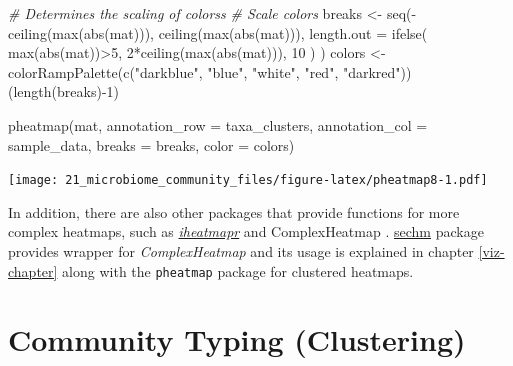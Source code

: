 \documentclass[
]{book}
\newenvironment{Shaded}{\begin{snugshade}}{\end{snugshade}}
\newcommand{\AttributeTok}[1]{\textcolor[rgb]{0.77,0.63,0.00}{#1}}
\newcommand{\CommentTok}[1]{\textcolor[rgb]{0.56,0.35,0.01}{\textit{#1}}}
\newcommand{\DecValTok}[1]{\textcolor[rgb]{0.00,0.00,0.81}{#1}}
\newcommand{\FunctionTok}[1]{\textcolor[rgb]{0.00,0.00,0.00}{#1}}
\newcommand{\NormalTok}[1]{#1}
\newcommand{\OtherTok}[1]{\textcolor[rgb]{0.56,0.35,0.01}{#1}}
\newcommand{\SpecialCharTok}[1]{\textcolor[rgb]{0.00,0.00,0.00}{#1}}
\newcommand{\StringTok}[1]{\textcolor[rgb]{0.31,0.60,0.02}{#1}}
\begin{document}
\begin{Shaded}
\begin{Highlighting}[]
\CommentTok{\# Determines the scaling of colorss}
\CommentTok{\# Scale colors}
\NormalTok{breaks }\OtherTok{\textless{}{-}} \FunctionTok{seq}\NormalTok{(}\SpecialCharTok{{-}}\FunctionTok{ceiling}\NormalTok{(}\FunctionTok{max}\NormalTok{(}\FunctionTok{abs}\NormalTok{(mat))), }\FunctionTok{ceiling}\NormalTok{(}\FunctionTok{max}\NormalTok{(}\FunctionTok{abs}\NormalTok{(mat))), }
              \AttributeTok{length.out =} \FunctionTok{ifelse}\NormalTok{( }\FunctionTok{max}\NormalTok{(}\FunctionTok{abs}\NormalTok{(mat))}\SpecialCharTok{\textgreater{}}\DecValTok{5}\NormalTok{, }\DecValTok{2}\SpecialCharTok{*}\FunctionTok{ceiling}\NormalTok{(}\FunctionTok{max}\NormalTok{(}\FunctionTok{abs}\NormalTok{(mat))), }\DecValTok{10}\NormalTok{ ) )}
\NormalTok{colors }\OtherTok{\textless{}{-}} \FunctionTok{colorRampPalette}\NormalTok{(}\FunctionTok{c}\NormalTok{(}\StringTok{"darkblue"}\NormalTok{, }\StringTok{"blue"}\NormalTok{, }\StringTok{"white"}\NormalTok{, }\StringTok{"red"}\NormalTok{, }\StringTok{"darkred"}\NormalTok{))(}\FunctionTok{length}\NormalTok{(breaks)}\SpecialCharTok{{-}}\DecValTok{1}\NormalTok{)}

\FunctionTok{pheatmap}\NormalTok{(mat, }\AttributeTok{annotation\_row =}\NormalTok{ taxa\_clusters, }
         \AttributeTok{annotation\_col =}\NormalTok{ sample\_data,}
         \AttributeTok{breaks =}\NormalTok{ breaks,}
         \AttributeTok{color =}\NormalTok{ colors)}
\end{Highlighting}
\end{Shaded}

\texttt{[image: 21\_microbiome\_community\_files/figure-latex/pheatmap8-1.pdf]}

In addition, there are also other packages that provide functions for
more complex heatmaps, such as
\href{https://docs.ropensci.org/iheatmapr/articles/full_vignettes/iheatmapr.html}{\emph{iheatmapr}}
and ComplexHeatmap \citep{ComplexHeatmap}.
\href{http://www.bioconductor.org/packages/release/bioc/vignettes/sechm/inst/doc/sechm.html}{sechm}
package provides wrapper for \emph{ComplexHeatmap} and its usage is
explained in chapter \ref{viz-chapter} along with the \texttt{pheatmap}
package for clustered heatmaps.

\hypertarget{clustering}{%
\chapter{Community Typing (Clustering)}\label{clustering}}
\end{document}
